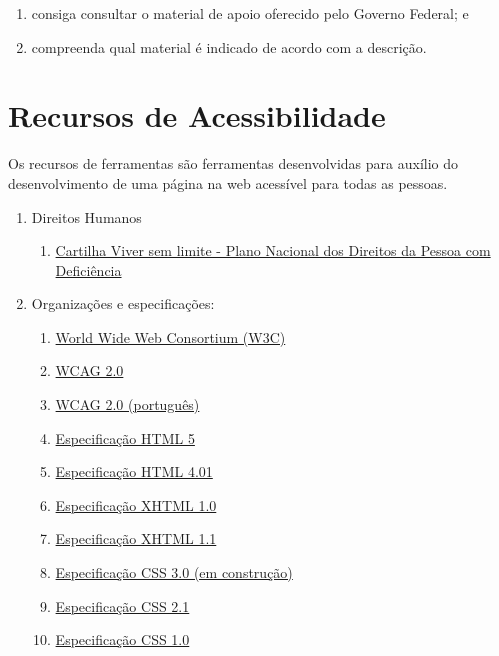 \documentclass[
  12pt,
  openright,
  twoside,
  a4paper,
  english,
  french,
  spanish,
  brazil
]{abntex2}
\begin{document}
\begin{enumerate}
  \item consiga consultar o material de apoio oferecido pelo Governo Federal; e
  \item compreenda qual material é indicado de acordo com a descrição.
\end{enumerate}

\chapter{Recursos de Acessibilidade}

Os recursos de ferramentas são ferramentas desenvolvidas para auxílio do
desenvolvimento de uma página na web acessível para todas as pessoas.

\begin{enumerate}
  \item Direitos Humanos
  \begin{enumerate}
    \item \href{https://www.gov.br/mdh/pt-br/centrais-de-conteudo/pessoa-com-deficiencia/cartilha-viver-sem-limite-plano-nacional-dos-direitos-da-pessoa-com-deficiencia}{Cartilha Viver sem limite - Plano Nacional dos Direitos da Pessoa com Deficiência}
  \end{enumerate}
  \item Organizações e especificações:
  \begin{enumerate}
    \item \href{http://www.w3.org/}{World Wide Web Consortium (W3C)}
    \item \href{http://www.w3.org/TR/WCAG20}{WCAG 2.0}
    \item
      \href{https://www.w3.org/Translations/WCAG20-pt-PT}{WCAG 2.0 (português)}
    \item \href{http://www.w3.org/TR/html5}{Especificação HTML 5}
    \item \href{http://www.w3.org/TR/html401}{Especificação HTML 4.01}
    \item \href{http://www.w3.org/TR/xhtml1}{Especificação XHTML 1.0}
    \item \href{http://www.w3.org/TR/xhtml11}{Especificação XHTML 1.1}
    \item \href{http://www.w3.org/Style/CSS/current-work}{Especificação CSS 3.0 (em construção)}
    \item \href{http://www.w3.org/TR/CSS21}{Especificação CSS 2.1}
    \item \href{http://www.w3.org/TR/CSS1}{Especificação CSS 1.0}

\end{enumerate}
\end{enumerate}
\end{document}

